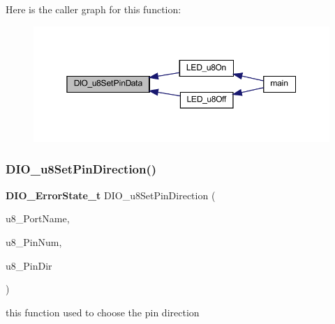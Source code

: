 Here is the caller graph for this function\+:
\nopagebreak
\begin{figure}[H]
\begin{center}
\leavevmode
\includegraphics[width=350pt]{_d_i_o__interface_8h_afd3ecd8f36ed8d5af71a1cc1e7951c57_icgraph}
\end{center}
\end{figure}
\mbox{\label{_d_i_o__interface_8h_ac0ce7d6cfdca971c649a94cfaccfb292}} 
\subsubsection{D\+I\+O\+\_\+u8\+Set\+Pin\+Direction()}
{\footnotesize\ttfamily \textbf{ D\+I\+O\+\_\+\+Error\+State\+\_\+t} D\+I\+O\+\_\+u8\+Set\+Pin\+Direction (\begin{DoxyParamCaption}\item[{\textbf{ D\+I\+O\+Port\+\_\+t}}]{u8\+\_\+\+Port\+Name,  }\item[{\textbf{ D\+I\+O\+Pin\+\_\+t}}]{u8\+\_\+\+Pin\+Num,  }\item[{\textbf{ D\+I\+O\+Dir\+\_\+t}}]{u8\+\_\+\+Pin\+Dir }\end{DoxyParamCaption})}



this function used to choose the pin direction 


